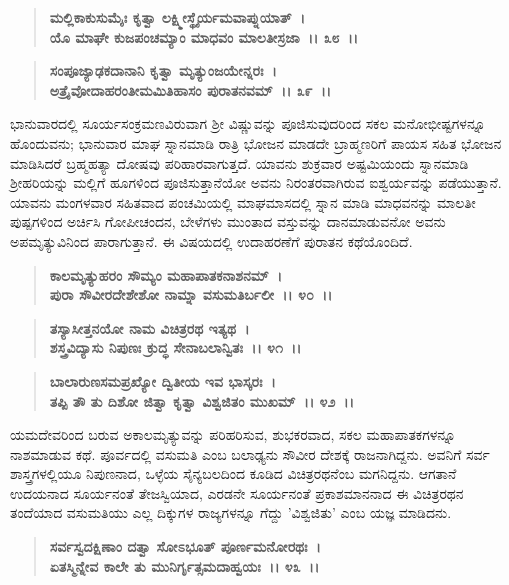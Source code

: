 \begin{verse}
\textbf{ಮಲ್ಲಿಕಾಕುಸುಮೈಃ ಕೃತ್ವಾ ಲಕ್ಷ್ಮೀಸ್ಥೈರ್ಯಮವಾಪ್ನುಯಾತ್~।}\\\textbf{ಯೊ ಮಾಘೇ ಕುಜಪಂಚಮ್ಯಾಂ ಮಾಧವಂ ಮಾಲತೀಸ್ರಜಾ~।। ೩೮~।।} 
\end{verse}

\begin{verse}
\textbf{ಸಂಪೂಜ್ಯಾಢಕದಾನಾನಿ ಕೃತ್ವಾ ಮೃತ್ಯುಂಜಯೇನ್ನರಃ~।}\\\textbf{ಅತ್ರೈವೋದಾಹರಂತೀಮಮಿತಿಹಾಸಂ ಪುರಾತನವಮ್~।। ೩೯~।।}
\end{verse}

ಭಾನುವಾರದಲ್ಲಿ ಸೂರ್ಯಸಂಕ್ರಮಣವಿರುವಾಗ ಶ‍್ರೀ ವಿಷ್ಣುವನ್ನು ಪೂಜಿಸುವುದರಿಂದ ಸಕಲ ಮನೋಭೀಷ್ಟಗಳನ್ನೂ ಹೊಂದುವನು; ಭಾನುವಾರ ಮಾಘ ಸ್ನಾನಮಾಡಿ ರಾತ್ರಿ ಭೋಜನ ಮಾಡದೇ ಬ್ರಾಹ್ಮಣರಿಗೆ ಪಾಯಸ ಸಹಿತ ಭೋಜನ ಮಾಡಿಸಿದರೆ ಬ್ರಹ್ಮಹತ್ಯಾ ದೋಷವು ಪರಿಹಾರವಾಗುತ್ತದೆ. ಯಾವನು ಶುಕ್ರವಾರ ಅಷ್ಟಮಿಯಂದು ಸ್ನಾನಮಾಡಿ ಶ‍್ರೀಹರಿಯನ್ನು ಮಲ್ಲಿಗೆ ಹೂಗಳಿಂದ ಪೂಜಿಸುತ್ತಾನೆಯೋ ಅವನು ನಿರಂತರವಾಗಿರುವ ಐಶ್ವರ್ಯವನ್ನು ಪಡೆಯುತ್ತಾನೆ. ಯಾವನು ಮಂಗಳವಾರ ಸಹಿತವಾದ ಪಂಚಮಿಯಲ್ಲಿ ಮಾಘಮಾಸದಲ್ಲಿ ಸ್ನಾನ ಮಾಡಿ ಮಾಧವನನ್ನು ಮಾಲತೀ ಪುಷ್ಪಗಳಿಂದ ಅರ್ಚಿಸಿ ಗೋಪೀಚಂದನ, ಬೇಳೆಗಳು ಮುಂತಾದ ವಸ್ತುವನ್ನು ದಾನಮಾಡುವನೋ ಅವನು ಅಪಮೃತ್ಯುವಿನಿಂದ ಪಾರಾಗುತ್ತಾನೆ. ಈ ವಿಷಯದಲ್ಲಿ ಉದಾಹರಣೆಗೆ ಪುರಾತನ ಕಥೆಯೊಂದಿದೆ.

\begin{verse}
\textbf{ಕಾಲಮೃತ್ಯುಹರಂ ಸೌಮ್ಯಂ ಮಹಾಪಾತಕನಾಶನಮ್~।}\\\textbf{ಪುರಾ ಸೌವೀರದೇಶೇಶೋ ನಾಮ್ನಾ ವಸುಮತಿರ್ಬಲೀ~।। ೪೦~।। }
\end{verse}

\begin{verse}
\textbf{ತಸ್ಯಾಸೀತ್ತನಯೋ ನಾಮ ವಿಚಿತ್ರರಥ ಇತ್ಯಥ~।}\\\textbf{ಶಸ್ತ್ರವಿದ್ಯಾಸು ನಿಪುಣಃ ಕ್ರುದ್ಧ ಸೇನಾಬಲಾನ್ವಿತಃ~।। ೪೧~।।}
\end{verse}

\begin{verse}
\textbf{ಬಾಲಾರುಣಸಮಪ್ರಖ್ಯೋ ದ್ವಿತೀಯ ಇವ ಭಾಸ್ಕರಃ~।}\\\textbf{ತಪ್ಪಿ ತೌ ತು ದಿಶೋ ಜಿತ್ವಾ ಕೃತ್ವಾ ವಿಶ್ವಜಿತಂ ಮುಖಮ್~।। ೪೨~।।}
\end{verse}

ಯಮದೇವರಿಂದ ಬರುವ ಅಕಾಲಮೃತ್ಯುವನ್ನು ಪರಿಹರಿಸುವ, ಶುಭಕರವಾದ, ಸಕಲ ಮಹಾಪಾತಕಗಳನ್ನೂ ನಾಶಮಾಡುವ ಕಥೆ. ಪೂರ್ವದಲ್ಲಿ ವಸುಮತಿ ಎಂಬ ಬಲಾಢ್ಯನು ಸೌವೀರ ದೇಶಕ್ಕೆ ರಾಜನಾಗಿದ್ದನು. ಅವನಿಗೆ ಸರ್ವ ಶಾಸ್ತ್ರಗಳಲ್ಲಿಯೂ ನಿಪುಣನಾದ, ಒಳ್ಳೆಯ ಸೈನ್ಯಬಲದಿಂದ ಕೂಡಿದ ವಿಚಿತ್ರರಥನೆಂಬ ಮಗನಿದ್ದನು. ಆಗತಾನೆ ಉದಯನಾದ ಸೂರ್ಯನಂತೆ ತೇಜಸ್ವಿಯಾದ, ಎರಡನೇ ಸೂರ್ಯನಂತೆ ಪ್ರಕಾಶಮಾನನಾದ ಈ ವಿಚಿತ್ರರಥನ ತಂದೆಯಾದ ವಸುಮತಿಯು ಎಲ್ಲ ದಿಕ್ಕುಗಳ ರಾಜ್ಯಗಳನ್ನೂ ಗೆದ್ದು 'ವಿಶ್ವಜಿತು' ಎಂಬ ಯಜ್ಞ ಮಾಡಿದನು.

\begin{verse}
\textbf{ಸರ್ವಸ್ವದಕ್ಷಿಣಾಂ ದತ್ವಾ ಸೋಽಭೂತ್ ಪೂರ್ಣಮನೋರಥಃ~।}\\\textbf{ಏತಸ್ಮಿನ್ನೇವ ಕಾಲೇ ತು ಮುನಿರ್ಗೃತ್ಸಮದಾಹ್ವಯಃ~।। ೪೩~।। }
\end{verse}

